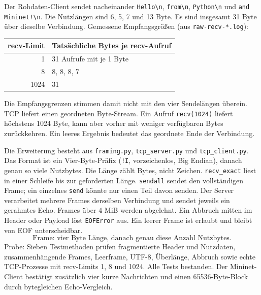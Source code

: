 \documentclass[a4paper,11pt]{article}
\newif\ifexplain
\newcommand{\explain}[1]{\ifexplain\begin{erklbox}#1\end{erklbox}\fi}
\begin{document}
Der Rohdaten-Client sendet nacheinander \texttt{Hello\textbackslash n},
\texttt{from\textbackslash n}, \texttt{Python\textbackslash n} und
\texttt{and Mininet!\textbackslash n}. Die Nutzlängen sind 6, 5, 7 und 13 Byte.
Es sind insgesamt 31 Byte über dieselbe Verbindung.
Gemessene Empfangsgrößen (aus \texttt{raw-recv-*.log}):
\begin{center}\begin{tabular}{rl}\toprule
recv-Limit & Tatsächliche Bytes je recv-Aufruf\\\midrule
1 & 31 Aufrufe mit je 1 Byte\\
8 & 8, 8, 8, 7\\
1024 & 31\\
\bottomrule\end{tabular}\end{center}
Die Empfangsgrenzen stimmen damit nicht mit den vier Sendelängen überein.
TCP liefert einen geordneten Byte-Stream. Ein Aufruf \texttt{recv(1024)}
liefert höchstens 1024 Byte, kann aber vorher mit weniger verfügbaren Bytes
zurückkehren. Ein leeres Ergebnis bedeutet das geordnete Ende der Verbindung.

Die Erweiterung besteht aus \texttt{framing.py}, \texttt{tcp\_server.py}
und \texttt{tcp\_client.py}. Das Format ist ein Vier-Byte-Präfix
(\texttt{!I}, vorzeichenlos, Big Endian), danach genau so viele Nutzbytes.
Die Länge zählt Bytes, nicht Zeichen. \texttt{recv\_exact} liest in einer
Schleife bis zur geforderten Länge. \texttt{sendall} sendet den vollständigen
Frame; ein einzelnes \texttt{send} könnte nur einen Teil davon senden.
Der Server verarbeitet mehrere Frames derselben Verbindung und sendet
jeweils ein gerahmtes Echo. Frames über 4 MiB werden abgelehnt.
Ein Abbruch mitten im Header oder Payload löst \texttt{EOFError} aus.
Ein leerer Frame ist erlaubt und bleibt von EOF unterscheidbar.
\[\boxed{\text{Frame: vier Byte Länge, danach genau diese Anzahl Nutzbytes.}}\]
Probe: Sieben Testmethoden prüfen fragmentierte Header und Nutzdaten,
zusammenhängende Frames, Leerframe, UTF-8, Überlänge, Abbruch sowie echte
TCP-Prozesse mit recv-Limits 1, 8 und 1024. Alle Tests bestanden.
Der Mininet-Client bestätigt zusätzlich vier kurze Nachrichten und einen
65536-Byte-Block durch bytegleichen Echo-Vergleich.
\explain{TCP muss die Grenzen der send-Aufrufe nicht übertragen. Ein Sender
kann etwa viermal fünf Byte schreiben; der Empfänger kann daraus zweimal
acht Byte und einmal vier Byte lesen. Auch das ist korrekt.
Das Längenpräfix legt die Grenze erst in unserem Anwendungsprotokoll fest.
Zuerst warten wir auf vier Headerbytes, dann auf die angegebene Nutzlast.
Dabei darf jeder recv-Aufruf weniger liefern als angefordert.
Bei UTF-8 hat ein Umlaut mehr als ein Byte. Deshalb wird zuerst codiert,
dann die Byte-Länge in das Präfix geschrieben. Eine Größenbegrenzung verhindert,
dass ein fremder Header eine beliebig große Speicheranforderung auslöst.}
\end{document}
